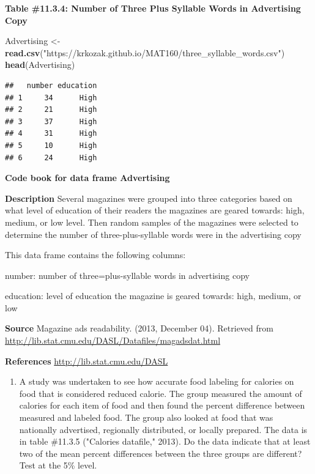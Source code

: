 \documentclass[]{book}
\newenvironment{Shaded}{\begin{snugshade}}{\end{snugshade}}
\newcommand{\KeywordTok}[1]{\textcolor[rgb]{0.13,0.29,0.53}{\textbf{#1}}}
\newcommand{\NormalTok}[1]{#1}
\newcommand{\StringTok}[1]{\textcolor[rgb]{0.31,0.60,0.02}{#1}}
\providecommand{\tightlist}{%
  \setlength{\itemsep}{0pt}\setlength{\parskip}{0pt}}
\begin{document}
\textbf{Table \#11.3.4: Number of Three Plus Syllable Words in Advertising Copy}

\begin{Shaded}
\begin{Highlighting}[]
\NormalTok{Advertising <-}\StringTok{ }\KeywordTok{read.csv}\NormalTok{(}\StringTok{"https://krkozak.github.io/MAT160/three_syllable_words.csv"}\NormalTok{)}
\KeywordTok{head}\NormalTok{(Advertising)}
\end{Highlighting}
\end{Shaded}

\begin{verbatim}
##   number education
## 1     34      High
## 2     21      High
## 3     37      High
## 4     31      High
## 5     10      High
## 6     24      High
\end{verbatim}

\textbf{Code book for data frame Advertising}

\textbf{Description}
Several magazines were grouped into three categories based on what level of education of their readers the magazines are geared towards: high, medium, or low level. Then random samples of the magazines were selected to determine the number of three-plus-syllable words were in the advertising copy

This data frame contains the following columns:

number: number of three=plus-syllable words in advertising copy

education: level of education the magazine is geared towards: high, medium, or low

\textbf{Source}
Magazine ads readability. (2013, December 04). Retrieved from \url{http://lib.stat.cmu.edu/DASL/Datafiles/magadsdat.html}

\textbf{References}
\url{http://lib.stat.cmu.edu/DASL}

\begin{enumerate}
\def\labelenumi{\arabic{enumi}.}
\setcounter{enumi}{3}
\tightlist
\item
  A study was undertaken to see how accurate food labeling for calories on food that is considered reduced calorie. The group measured the amount of calories for each item of food and then found the percent difference between measured and labeled food. The group also looked at food that was nationally advertised, regionally distributed, or locally prepared. The data is in table \#11.3.5 ("Calories datafile," 2013). Do the data indicate that at least two of the mean percent differences between the three groups are different? Test at the 5\% level.
\end{enumerate}
\end{document}
